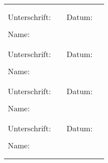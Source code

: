 \documentclass[
11pt,
a4paper,
ngerman,
]{article}
\begin{document}
\begin{table}[H]
	\begin{tabularx}{\textwidth}{ |m{2cm}Xm{1.2cm}X| }
		\hline
		\multicolumn{4}{|c|}{} \\
		\multicolumn{4}{|c|}{} \\
		Unterschrift: & \makebox[0.3\columnwidth]{\dotfill} & Datum: & \makebox[0.3\columnwidth]{\dotfill} \\
		\multicolumn{4}{|c|}{} \\
		Name: & \makebox[0.3\columnwidth]{\dotfill} & \multicolumn{2}{c|}{} \\
		\multicolumn{4}{|c|}{} \\
		\multicolumn{4}{|c|}{} \\
		Unterschrift: & \makebox[0.3\columnwidth]{\dotfill} & Datum: & \makebox[0.3\columnwidth]{\dotfill} \\
		\multicolumn{4}{|c|}{} \\
		Name: & \makebox[0.3\columnwidth]{\dotfill} & \multicolumn{2}{c|}{} \\
		\multicolumn{4}{|c|}{} \\
		\multicolumn{4}{|c|}{} \\
		Unterschrift: & \makebox[0.3\columnwidth]{\dotfill} & Datum: & \makebox[0.3\columnwidth]{\dotfill} \\
		\multicolumn{4}{|c|}{} \\
		Name: & \makebox[0.3\columnwidth]{\dotfill} & \multicolumn{2}{c|}{} \\
		\multicolumn{4}{|c|}{} \\
		\multicolumn{4}{|c|}{} \\
		Unterschrift: & \makebox[0.3\columnwidth]{\dotfill} & Datum: & \makebox[0.3\columnwidth]{\dotfill} \\
		\multicolumn{4}{|c|}{} \\
		Name: & \makebox[0.3\columnwidth]{\dotfill} & \multicolumn{2}{c|}{} \\
		\multicolumn{4}{|c|}{} \\
		\multicolumn{4}{|c|}{} \\
		\hline
	\end{tabularx}
\end{table}
\end{document}
